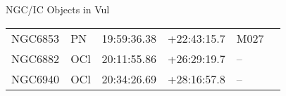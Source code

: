 \begin{block}{NGC/IC Objects in Vul}
  \centering
  \begin{tabularx}{\textwidth}{llrrll} \toprule 
    NGC6853 & PN & 19:59:36.38 & +22:43:15.7  & M027 \\ 
    NGC6882 & OCl & 20:11:55.86 & +26:29:19.7  & -- \\ 
    NGC6940 & OCl & 20:34:26.69 & +28:16:57.8  & -- \\ 
  \end{tabularx}
\end{block}